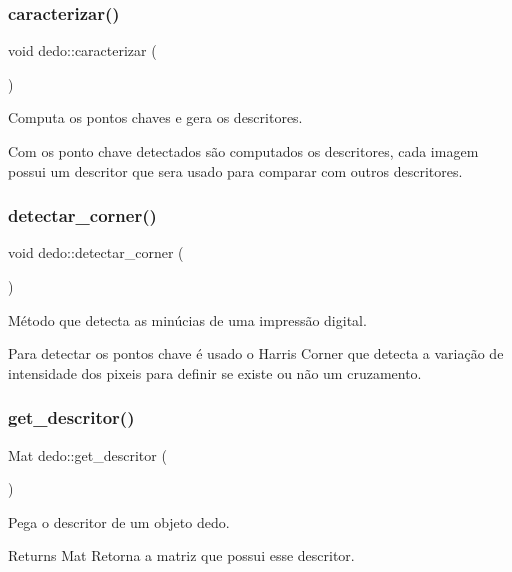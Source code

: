 \subsubsection{\texorpdfstring{caracterizar()}{caracterizar()}}
{\footnotesize\ttfamily void dedo\+::caracterizar (\begin{DoxyParamCaption}{ }\end{DoxyParamCaption})}



Computa os pontos chaves e gera os descritores. 

Com os ponto chave detectados são computados os descritores, cada imagem possui um descritor que sera usado para comparar com outros descritores.\mbox{\label{classdedo_a4418d126f687ab73c41bb3768f6c0d34}} 
\subsubsection{\texorpdfstring{detectar\+\_\+corner()}{detectar\_corner()}}
{\footnotesize\ttfamily void dedo\+::detectar\+\_\+corner (\begin{DoxyParamCaption}{ }\end{DoxyParamCaption})}



Método que detecta as minúcias de uma impressão digital. 

Para detectar os pontos chave é usado o Harris Corner que detecta a variação de intensidade dos pixeis para definir se existe ou não um cruzamento.\mbox{\label{classdedo_adc4d5e0f4d079cc9062cf1eb467d23b6}} 
\subsubsection{\texorpdfstring{get\+\_\+descritor()}{get\_descritor()}}
{\footnotesize\ttfamily Mat dedo\+::get\+\_\+descritor (\begin{DoxyParamCaption}{ }\end{DoxyParamCaption})}



Pega o descritor de um objeto dedo. 

\begin{DoxyReturn}{Returns}
Mat Retorna a matriz que possui esse descritor. 
\end{DoxyReturn}
\mbox{\label{classdedo_a712670af9bc0a9c755b6f67de9494064}} 
